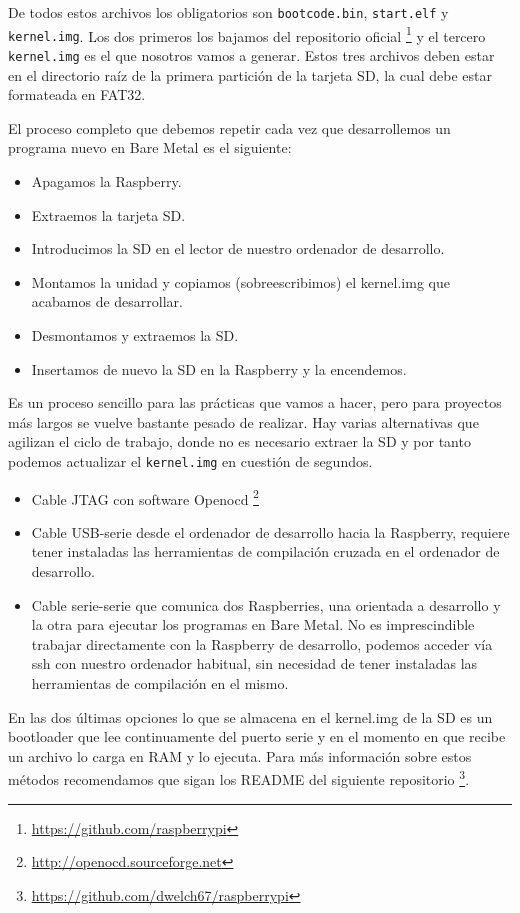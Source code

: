 De todos estos archivos los obligatorios son {\tt bootcode.bin}, {\tt start.elf} y
{\tt kernel.img}. Los dos primeros los bajamos del repositorio oficial
\footnote{\url{https://github.com/raspberrypi}} y el tercero {\tt kernel.img} es el que nosotros
vamos a generar. Estos tres archivos deben estar en el directorio raíz de la primera partición
de la tarjeta SD, la cual debe estar formateada en FAT32.

El proceso completo que debemos repetir cada vez que desarrollemos un programa nuevo
en Bare Metal es el siguiente:

\begin{itemize}
  \item Apagamos la Raspberry.
  \item Extraemos la tarjeta SD.
  \item Introducimos la SD en el lector de nuestro ordenador de desarrollo.
  \item Montamos la unidad y copiamos (sobreescribimos) el kernel.img que acabamos
        de desarrollar.
  \item Desmontamos y extraemos la SD.
  \item Insertamos de nuevo la SD en la Raspberry y la encendemos.
\end{itemize}

Es un proceso sencillo para las prácticas que vamos a hacer, pero para proyectos más largos
se vuelve bastante pesado de realizar. Hay varias alternativas que agilizan el ciclo de
trabajo, donde no es necesario extraer la SD y por tanto podemos actualizar el {\tt kernel.img}
en cuestión de segundos.

\begin{itemize}
  \item Cable JTAG con software Openocd \footnote{\url{http://openocd.sourceforge.net}}
  \item Cable USB-serie desde el ordenador de desarrollo hacia la Raspberry, requiere
        tener instaladas las herramientas de compilación cruzada en el ordenador de desarrollo.
  \item Cable serie-serie que comunica dos Raspberries, una orientada a desarrollo y la otra
        para ejecutar los programas en Bare Metal. No es imprescindible trabajar directamente
        con la Raspberry de desarrollo, podemos acceder vía ssh con nuestro ordenador habitual,
        sin necesidad de tener instaladas las herramientas de compilación en el mismo.
\end{itemize}

En las dos últimas opciones lo que se almacena en el kernel.img de la SD es un bootloader
que lee continuamente del puerto serie y en el momento en que recibe un archivo lo carga
en RAM y lo ejecuta. Para más información sobre estos métodos recomendamos que sigan los
README del siguiente repositorio \footnote{\url{https://github.com/dwelch67/raspberrypi}}.


